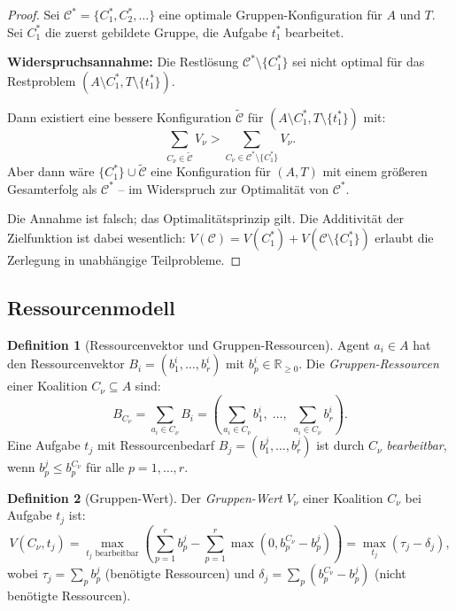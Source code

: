 \documentclass[a4paper,12pt]{article}
\theoremstyle{definition}
\newtheorem{definition}{Definition}
\begin{document}
\begin{proof}
    Sei $\mathcal{C}^* = \{C_1^*, C_2^*, \ldots\}$ eine optimale
    Gruppen-Konfiguration f\"{u}r $A$ und $T$. Sei $C_1^*$ die zuerst gebildete
    Gruppe, die Aufgabe $t_1^*$ bearbeitet.

    \textbf{Widerspruchsannahme:} Die Restl\"{o}sung $\mathcal{C}^* \setminus \{C_1^*\}$
    sei nicht optimal f\"{u}r das Restproblem $(A \setminus C_1^*, T \setminus \{t_1^*\})$.

    Dann existiert eine bessere Konfiguration $\tilde{\mathcal{C}}$ f\"{u}r
    $(A \setminus C_1^*, T \setminus \{t_1^*\})$ mit:
    \[
        \sum_{C_\nu \in \tilde{\mathcal{C}}} V_\nu
        > \sum_{C_\nu \in \mathcal{C}^* \setminus \{C_1^*\}} V_\nu.
    \]
    Aber dann w\"{a}re $\{C_1^*\} \cup \tilde{\mathcal{C}}$ eine Konfiguration f\"{u}r
    $(A, T)$ mit einem gr\"{o}{\ss}eren Gesamterfolg als $\mathcal{C}^*$ -- im
    Widerspruch zur Optimalit\"{a}t von $\mathcal{C}^*$.

    Die Annahme ist falsch; das Optimalit\"{a}tsprinzip gilt.
    Die Additivit\"{a}t der Zielfunktion ist dabei wesentlich:
    $V(\mathcal{C}) = V(C_1^*) + V(\mathcal{C} \setminus \{C_1^*\})$
    erlaubt die Zerlegung in unabh\"{a}ngige Teilprobleme. \qedhere
\end{proof}

\subsection{Ressourcenmodell}

\begin{definition}[Ressourcenvektor und Gruppen-Ressourcen]
    Agent $a_i \in A$ hat den Ressourcenvektor $B_i = (b_1^i, \ldots, b_r^i)$
    mit $b_p^i \in \mathbb{R}_{\geq 0}$. Die \emph{Gruppen-Ressourcen} einer
    Koalition $C_\nu \subseteq A$ sind:
    \[
        B_{C_\nu} = \sum_{a_i \in C_\nu} B_i
        = \left(\sum_{a_i \in C_\nu} b_1^i,\; \ldots,\; \sum_{a_i \in C_\nu} b_r^i\right).
    \]
    Eine Aufgabe $t_j$ mit Ressourcenbedarf $B_j = (b_1^j, \ldots, b_r^j)$
    ist durch $C_\nu$ \emph{bearbeitbar}, wenn $b_p^j \leq b_p^{C_\nu}$
    f\"{u}r alle $p = 1, \ldots, r$.
\end{definition}

\begin{definition}[Gruppen-Wert]
    Der \emph{Gruppen-Wert} $V_\nu$ einer Koalition $C_\nu$ bei Aufgabe $t_j$ ist:
    \[
        V(C_\nu, t_j) = \max_{t_j \text{ bearbeitbar}} \left(
            \sum_{p=1}^r b_p^j - \sum_{p=1}^r \max(0, b_p^{C_\nu} - b_p^j)
        \right)
        = \max_{t_j} \left(\tau_j - \delta_j\right),
    \]
    wobei $\tau_j = \sum_p b_p^j$ (ben\"{o}tigte Ressourcen) und
    $\delta_j = \sum_p (b_p^{C_\nu} - b_p^j)$ (nicht ben\"{o}tigte Ressourcen).
\end{definition}
\end{document}
